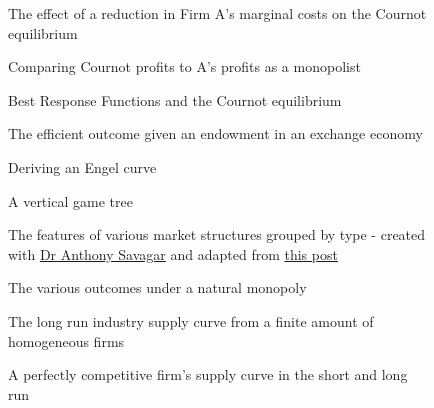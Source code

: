 \documentclass{article}
\begin{document}
\begin{figure}[H]
    \centering
    
    \caption{The effect of a reduction in Firm A's marginal costs on the Cournot equilibrium}
    \label{fig:10}
\end{figure}
\begin{figure}[H]
    \centering
    
    \caption{Comparing Cournot profits to A's profits as a monopolist}
    \label{fig:11}
\end{figure}
\begin{figure}[H]
    \centering
    
    \caption{Best Response Functions and the Cournot equilibrium}
    \label{fig:12}
\end{figure}
\begin{figure}[H]
    \centering
    
    \caption{The efficient outcome given an endowment in an exchange economy}
    \label{fig:13}
\end{figure}
\begin{figure}[H]
    \centering
    
    \caption{Deriving an Engel curve}
    \label{fig:14}
\end{figure}
\begin{figure}[H]
    \centering
    
    \caption{A vertical game tree}
    \label{fig:15}
\end{figure}
\begin{figure}[H]
    \centering
    
    \caption{The features of various market structures grouped by type - created with \href{https://github.com/asavagar}{Dr Anthony Savagar} and adapted from \href{https://tex.stackexchange.com/questions/78846/creating-thicker-tikz-mindmap-connectors}{this post}}
    \label{fig:16}
\end{figure}
\begin{figure}[H]
    \centering
    
    \caption{The various outcomes under a natural monopoly}
    \label{fig:17}
\end{figure}
\begin{figure}[H]
    \centering
    
    \caption{The long run industry supply curve from a finite amount of homogeneous firms}
    \label{fig:18}
\end{figure}
\begin{figure}[H]
    \centering
    
    \caption{A perfectly competitive firm's supply curve in the short and long run}
    \label{fig:19}
\end{figure}
\end{document}
